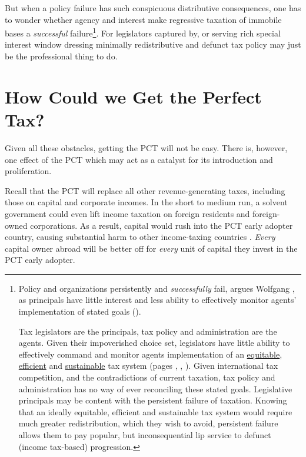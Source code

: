 But when a policy failure has such conspicuous distributive consequences, one has to wonder whether agency and interest make regressive taxation of immobile bases a \emph{successful} failure\footnote{Policy and organizations persistently and \emph{successfully} fail, argues Wolfgang \citeauthor{Seibel-1996-aa}, as principals have little interest and less ability to effectively monitor agents' implementation of stated goals (\citeyear{Seibel-1996-aa}).

Tax legislators are the principals, tax policy and administration are the agents.
Given their impoverished choice set, legislators have little ability to effectively command and monitor agents implementation of an \hyperref[sec:Equity]{equitable}, \hyperref[sec:Efficiency]{efficient} and \hyperref[sec:Sustainability]{sustainable} tax system (pages \pageref{sec:Equity}, \pageref{sec:Efficiency}, \pageref{sec:Sustainability}).
Given international tax competition, and the contradictions of current taxation, tax policy and administration has no way of ever reconciling these stated goals.
Legislative principals may be content with the persistent failure of taxation.
Knowing that an ideally equitable, efficient and sustainable tax system would require much greater redistribution, which they wish to avoid, persistent failure allows them to pay popular, but inconsequential lip service to defunct (income tax-based) progression.}.
For legislators captured by, or serving rich special interest window dressing minimally redistributive and defunct tax policy may just be the professional thing to do.

\section[Prospects of the PCT]{How Could we Get the Perfect Tax?}
	\label{sec:HowToGetIt}
Given all these obstacles, getting the PCT will not be easy.
There is, however, one effect of the PCT which may act as a catalyst for its introduction and proliferation.

Recall that the PCT will replace all other revenue-generating taxes, including those on capital and corporate incomes.
In the short to medium run, a solvent government could even lift income taxation on foreign residents and foreign-owned corporations.
As a result, capital would rush into the PCT early adopter country, causing substantial harm to other income-taxing countries \citep[12]{Dalsgaard2005}.
\emph{Every} capital owner abroad will be better off for \emph{every} unit of capital they invest in the PCT early adopter.

